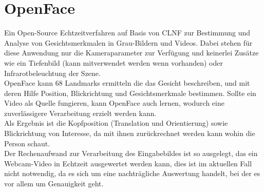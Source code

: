 \section{OpenFace}
\label{OpenFace}
Ein Open-Source Echtzeitverfahren auf Basis von CLNF zur Bestimmung und Analyse von Gesichtsmerkmalen in Grau-Bildern und Videos. Dabei stehen für diese Anwendung nur die Kameraparameter zur Verfügung und keinerlei Zusätze wie ein Tiefenbild (kann mitverwendet werden wenn vorhanden) oder Infrarotbeleuchtung der Szene.\\
OpenFace kann 68 Landmarks ermitteln die das Gesicht beschreiben, und mit deren Hilfe Position, Blickrichtung und Gesichtsmerkmale bestimmen. Sollte ein Video als Quelle fungieren, kann OpenFace auch lernen, wodurch eine zuverlässigere Verarbeitung erzielt werden kann.\\
Als Ergebnis ist die Kopfposition (Translation und Orientierung) sowie Blickrichtung von Interesse, da mit ihnen zurückrechnet werden kann wohin die Person schaut.\\
Der Rechenaufwand zur Verarbeitung des Eingabebildes ist so ausgelegt, das ein Webcam-Video in Echtzeit ausgewertet werden kann, dies ist im aktuellen Fall nicht notwendig, da es sich um eine nachträgliche Auswertung handelt, bei der es vor allem um Genauigkeit geht.
